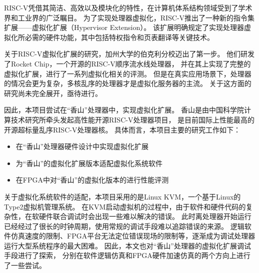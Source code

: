 RISC-V凭借其简洁、高效以及模块化的特性，在计算机体系结构领域受到了学术界和工业界的广泛瞩目。
为了实现处理器虚拟化，RISC-V推出了一种新的指令集扩展——虚拟化扩展（Hypervisor Extension）。
该扩展明确规定了实现处理器虚拟化所必需的硬件功能，其中包括特权指令和页表翻译等关键技术。

关于RISC-V虚拟化扩展的研究，加州大学的伯克利分校迈出了第一步。
他们研发了Rocket Chip，一个开源的RISC-V顺序流水线处理器，
并在其上实现了完整的虚拟化扩展，进行了一系列虚拟化相关的评测。
但是在真实应用场景下，处理器的情况会更为复杂，多核乱序的处理器才是虚拟化服务器的主流。
关于这方面的研究尚未完全展开，亟待进行。

因此，本项目尝试在“香山”处理器中，实现虚拟化扩展。
香山是由中国科学院计算技术研究所牵头发起高性能开源RISC-V处理器项目，
是目前国际上性能最高的开源超标量乱序RISC-V处理器核。
具体而言，本项目主要的研究工作如下：

\begin{itemize}
\item 在“香山”处理器硬件设计中实现虚拟化扩展
\item 为“香山”的虚拟化扩展版本适配虚拟化系统软件
\item 在FPGA中对“香山”的虚拟化版本的进行性能评测
\end{itemize}

关于虚拟化系统软件的适配，本项目采用的是Linux KVM，一个基于Linux的Type2虚拟机管理系统。
在KVM启动虚拟机的过程中，由于软件和硬件代码的复杂性，在软硬件联合调试时会出现一些难以解决的错误。
此时离处理器开始运行已经经过了很长的时钟周期，使用常规的调试手段难以追踪错误的来源。
逻辑软件仿真速度的限制、FPGA平台无法定位错误现场的限制等，逐渐成为调试处理器运行大型系统程序的最大困难。
因此，本文也对“香山”处理器的虚拟化扩展调试手段进行了探索，
分别在软件逻辑仿真和FPGA硬件加速仿真的两个方向上进行了一些尝试。